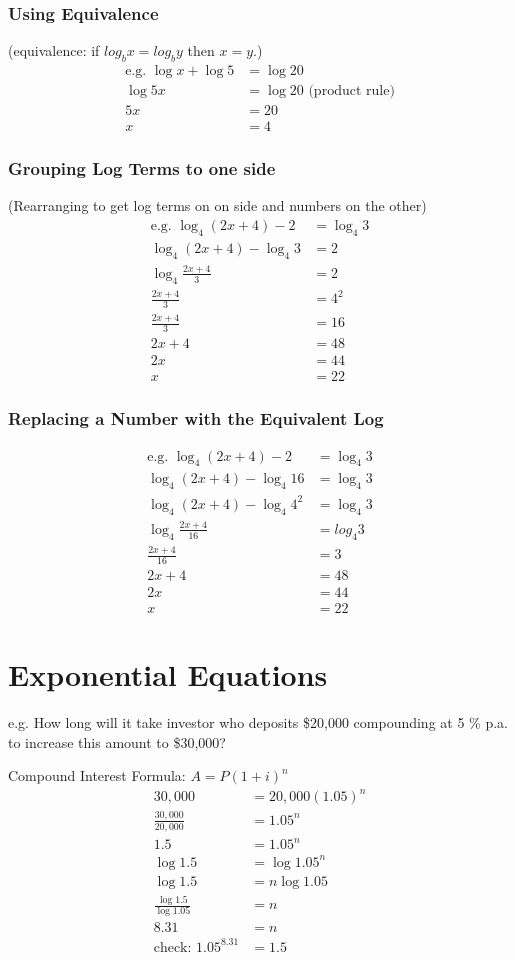 \documentclass{article}
\begin{document}
\subsubsection{Using Equivalence}
(equivalence: if $log_b{x}=log_b{y}$ then $x=y$.)
\begin{align*}
\text{e.g. }\log{x}+\log{5}&=\log{20}\\
\log{5x}&=\log{20}\text{ (product rule)}\\
5x&=20\\
x&=4
\end{align*}

\newpage

\subsubsection{Grouping Log Terms to one side}

(Rearranging to get log terms on on side and numbers on the other)
\begin{align*}
\text{e.g. }\log_4{(2x+4)}-2&=\log_4{3}\\
\log_4{(2x+4)}-\log_4{3}&=2\\
\log_4{\frac{2x+4}{3}}&=2\\
\frac{2x+4}{3}&=4^2\\
\frac{2x+4}{3}&=16\\
2x+4&=48\\
2x&=44\\
x&=22
\end{align*}

\subsubsection{Replacing a Number with the Equivalent Log}
\begin{align*}
\text{e.g. }\log_4{(2x+4)}-2&=\log_4{3}\\
\log_4{(2x+4)}-\log_4{16}&=\log_4{3}\\
\log_4{(2x+4)}-\log_4{4^2}&=\log_4{3}\\
\log_4\frac{2x+4}{16}&=log_4{3}\\
\frac{2x+4}{16}&=3\\
2x+4&=48\\
2x&=44\\
x&=22
\end{align*}

\section{Exponential Equations}
e.g. How long will it take investor who deposits \$20,000 compounding at 5 \% p.a. to increase this amount to \$30,000?

Compound Interest Formula:		$A=P(1+i)^n$
\begin{align*}
30,000&=20,000(1.05)^n\\
\frac{30,000}{20,000}&=1.05^n\\
1.5&=1.05^n\\
\log{1.5}&=\log{1.05^n}\\
\log{1.5}&=n\log{1.05}\\
\frac{\log{1.5}}{\log{1.05}}&=n\\
8.31&=n\\
\text{check: }1.05^{8.31}&=1.5
\end{align*}
\end{document}
